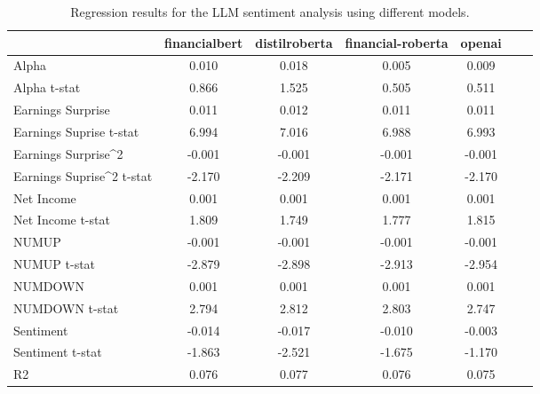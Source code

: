 \begin{table}
\caption{Regression results for the LLM sentiment analysis using different models.}
\label{tab:llm_regressions}
\begin{tabular}{lcccccc}
\toprule
 & financialbert & distilroberta & financial-roberta & openai \\
\midrule
Alpha & 0.010 & 0.018 & 0.005 & 0.009 \\
Alpha t-stat & 0.866 & 1.525 & 0.505 & 0.511 \\
Earnings Surprise & 0.011 & 0.012 & 0.011 & 0.011 \\
Earnings Suprise t-stat & 6.994 & 7.016 & 6.988 & 6.993 \\
Earnings Surprise^2 & -0.001 & -0.001 & -0.001 & -0.001 \\
Earnings Suprise^2 t-stat & -2.170 & -2.209 & -2.171 & -2.170 \\
Net Income & 0.001 & 0.001 & 0.001 & 0.001 \\
Net Income t-stat & 1.809 & 1.749 & 1.777 & 1.815 \\
NUMUP & -0.001 & -0.001 & -0.001 & -0.001 \\
NUMUP t-stat & -2.879 & -2.898 & -2.913 & -2.954 \\
NUMDOWN & 0.001 & 0.001 & 0.001 & 0.001 \\
NUMDOWN t-stat & 2.794 & 2.812 & 2.803 & 2.747 \\
Sentiment & -0.014 & -0.017 & -0.010 & -0.003 \\
Sentiment t-stat & -1.863 & -2.521 & -1.675 & -1.170 \\
R2 & 0.076 & 0.077 & 0.076 & 0.075 \\
\bottomrule
\end{tabular}
\end{table}
